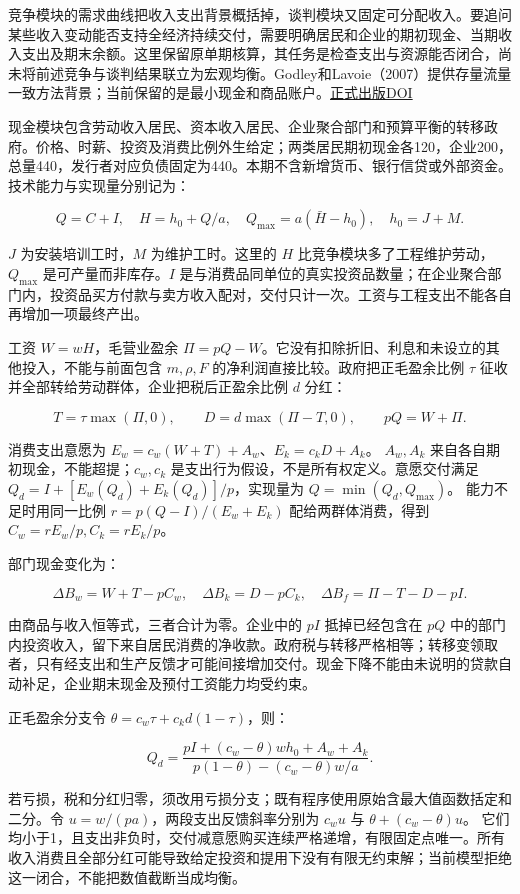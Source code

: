 \documentclass[UTF8,fontset=windows,12pt,a4paper,oneside,openany]{ctexbook}
\begin{document}
竞争模块的需求曲线把收入支出背景概括掉，谈判模块又固定可分配收入。要追问某些收入变动能否支持全经济持续交付，需要明确居民和企业的期初现金、当期收入支出及期末余额。这里保留原单期核算，其任务是检查支出与资源能否闭合，尚未将前述竞争与谈判结果联立为宏观均衡。Godley和Lavoie（2007）提供存量流量一致方法背景；当前保留的是最小现金和商品账户。\href{https://doi.org/10.1057/9780230626546}{正式出版DOI}

现金模块包含劳动收入居民、资本收入居民、企业聚合部门和预算平衡的转移政府。价格、时薪、投资及消费比例外生给定；两类居民期初现金各120，企业200，总量440，发行者对应负债固定为440。本期不含新增货币、银行信贷或外部资金。技术能力与实现量分别记为：

\[
Q=C+I,\quad H=h_0+Q/a,\quad Q_{\max}=a(\bar H-h_0),
\quad h_0=J+M.
\tag{14-21}
\]

\(J\) 为安装培训工时，\(M\) 为维护工时。这里的 \(H\) 比竞争模块多了工程维护劳动，\(Q_{\max}\) 是可产量而非库存。\(I\) 是与消费品同单位的真实投资品数量；在企业聚合部门内，投资品买方付款与卖方收入配对，交付只计一次。工资与工程支出不能各自再增加一项最终产出。

工资 \(W=wH\)，毛营业盈余 \(\Pi=pQ-W\)。它没有扣除折旧、利息和未设立的其他投入，不能与前面包含 \(m,\rho,F\) 的净利润直接比较。政府把正毛盈余比例 \(\tau\) 征收并全部转给劳动群体，企业把税后正盈余比例 \(d\) 分红：

\[
T=\tau\max(\Pi,0),\qquad
D=d\max(\Pi-T,0),\qquad pQ=W+\Pi.
\tag{14-22}
\]

消费支出意愿为
\(E_w=c_w(W+T)+A_w\)、\(E_k=c_kD+A_k\)。
\(A_w,A_k\) 来自各自期初现金，不能超提；\(c_w,c_k\) 是支出行为假设，不是所有权定义。意愿交付满足
\(Q_d=I+[E_w(Q_d)+E_k(Q_d)]/p\)，实现量为
\(Q=\min(Q_d,Q_{\max})\)。
能力不足时用同一比例
\(r=p(Q-I)/(E_w+E_k)\)
配给两群体消费，得到 \(C_w=rE_w/p,C_k=rE_k/p\)。

部门现金变化为：

\[
\Delta B_w=W+T-pC_w,\quad
\Delta B_k=D-pC_k,\quad
\Delta B_f=\Pi-T-D-pI.
\tag{14-23}
\]

由商品与收入恒等式，三者合计为零。企业中的 \(pI\) 抵掉已经包含在 \(pQ\) 中的部门内投资收入，留下来自居民消费的净收款。政府税与转移严格相等；转移变领取者，只有经支出和生产反馈才可能间接增加交付。现金下降不能由未说明的贷款自动补足，企业期末现金及预付工资能力均受约束。

正毛盈余分支令
\(\theta=c_w\tau+c_kd(1-\tau)\)，则：

\[
Q_d=
\frac{pI+(c_w-\theta)wh_0+A_w+A_k}
{p(1-\theta)-(c_w-\theta)w/a}.
\tag{14-24}
\]

若亏损，税和分红归零，须改用亏损分支；既有程序使用原始含最大值函数括定和二分。令 \(u=w/(pa)\)，两段支出反馈斜率分别为 \(c_wu\) 与
\(\theta+(c_w-\theta)u\)。
它们均小于1，且支出非负时，交付减意愿购买连续严格递增，有限固定点唯一。所有收入消费且全部分红可能导致给定投资和提用下没有有限无约束解；当前模型拒绝这一闭合，不能把数值截断当成均衡。
\end{document}
